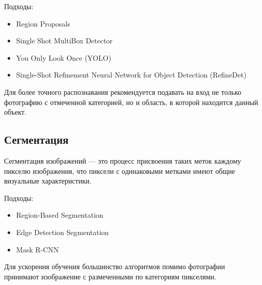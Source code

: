 \documentclass[14pt]{matmex-diploma}
\begin{document}
        Подходы:
        \begin{itemize}
            \item Region Proposals
            \item Single Shot MultiBox Detector
            \item You Only Look Once (YOLO)
            \item Single-Shot Refinement Neural Network for Object Detection (RefineDet)
        \end{itemize}
        
        Для более точного распознавания рекомендуется подавать на вход не только фотографию с отмеченной категорией, но и область, в которой находится данный объект.
        
    \subsection{Сегментация}
    
        Сегментация изображений — это процесс присвоения таких меток каждому пикселю изображения, что пиксели с одинаковыми метками имеют общие визуальные характеристики.
    
        Подходы:
        \begin{itemize}
            \item Region-Based Segmentation
            \item Edge Detection Segmentation
            \item Mask R-CNN
        \end{itemize}
        
        Для ускорения обучения большинство алгоритмов помимо фотографии принимают изображение с размеченными по категориям пикселями.
\end{document}
